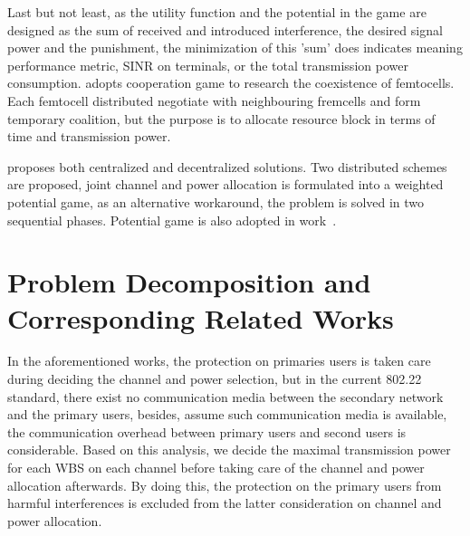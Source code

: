 Last but not least, as the utility function and the potential in the game are designed as the sum of received and introduced interference, the desired signal power and the punishment, the minimization of this 'sum' does indicates meaning  performance metric, \ie SINR on terminals, or the total transmission power consumption.
\cite{powerChannelAllocation_2015_shapley} adopts cooperation game to research the coexistence of femtocells.
Each femtocell distributed negotiate with neighbouring fremcells and form temporary coalition, but the purpose is to allocate resource block in terms of time and transmission power.



\cite{joint_power_channel_linkpair_08ICT} proposes both centralized and decentralized solutions.
Two distributed schemes are proposed, joint channel and power allocation is formulated into a weighted potential game, as an alternative workaround, the problem is solved in two sequential phases.
Potential game is also adopted in work~\cite{tvws_paper_networking2015}.



\section{Problem Decomposition and Corresponding Related Works}
In the aforementioned works, the protection on primaries users is taken care during deciding the channel and power selection, but in the current 802.22 standard, there exist no communication media between the secondary network and the primary users, besides, assume such communication media is available, the communication overhead between primary users and second users is considerable.
Based on this analysis, we decide the maximal transmission power for each WBS on each channel before taking care of the channel and power allocation afterwards.
By doing this, the protection on the primary users from harmful interferences is excluded from the latter consideration on channel and power allocation.


